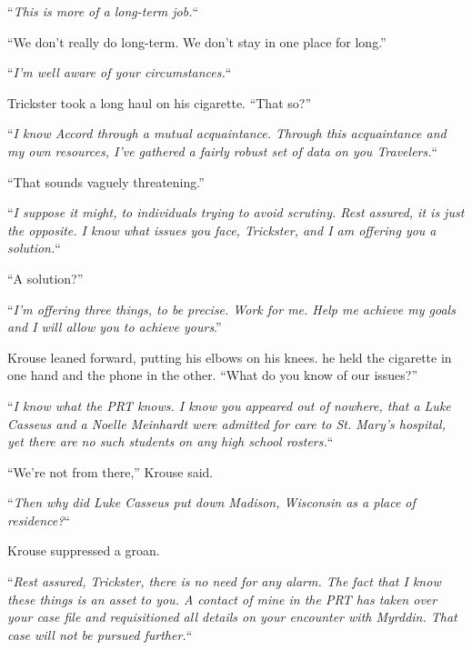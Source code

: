 ``\emph{This is more of a long-term job.}``



``We don't really do long-term.  We don't stay in one place for long.''



``\emph{I'm well aware of your circumstances.}``



Trickster took a long haul on his cigarette.  ``That so?''



``\emph{I know Accord through a mutual acquaintance.  Through this acquaintance and my own resources, I've gathered a fairly robust set of data on you Travelers.}``



``That sounds vaguely threatening.''



``\emph{I suppose it might, to individuals trying to avoid scrutiny.  Rest assured, it is just the opposite.  I know what issues you face, Trickster, and I am offering you a solution.}``



``A solution?''



``\emph{I'm offering three things, to be precise.  Work for me.  Help me achieve my goals and I will allow you to achieve yours}.''



Krouse leaned forward, putting his elbows on his knees.  he held the cigarette in one hand and the phone in the other.  ``What do you know of our issues?''



``\emph{I know what the PRT knows.  I know you appeared out of nowhere, that a Luke Casseus and a Noelle Meinhardt were admitted for care to St. Mary's hospital, yet there are no such students on any high school rosters.}``



``We're not from there,'' Krouse said.



``\emph{Then why did Luke Casseus put down Madison, Wisconsin as a place of residence?}``



Krouse suppressed a groan.



``\emph{Rest assured, Trickster, there is no need for any alarm.  The fact that I know these things is an asset to you.  A contact of mine in the PRT has taken over your case file and requisitioned all details on your encounter with Myrddin.  That case will not be pursued further.}``



